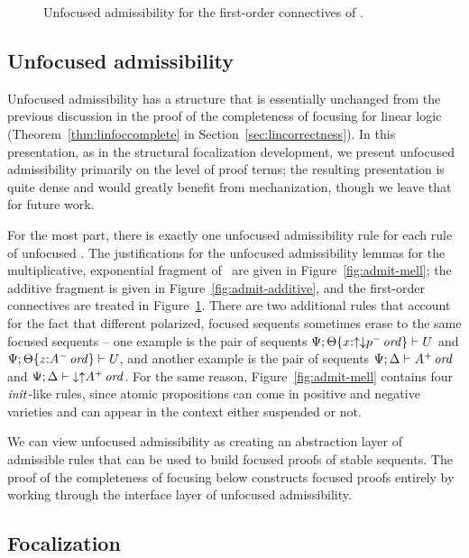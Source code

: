 \begin{figure}[tp]
\caption{Unfocused admissibility for the first-order connectives of \ollll.}
\label{fig:admit-fo}
\end{figure}

\subsection{Unfocused admissibility}
\label{sec:ord-unfocused-admissibility}

Unfocused admissibility has a structure that is essentially unchanged
from the previous discussion in the proof of the completeness of
focusing for linear logic (Theorem~\ref{thm:linfoccomplete} in
Section~\ref{sec:lincorrectness}). In this presentation, as in the
structural focalization development, we present unfocused
admissibility primarily on the level of proof terms; the resulting
presentation is quite dense and would greatly benefit from 
mechanization, though we leave that for future work. 

For the most part, there is exactly one unfocused admissibility rule
for each rule of unfocused \ollll. 
The justifications for the 
unfocused admissibility lemmas for the multiplicative, exponential
fragment of \ollll~are given in Figure~\ref{fig:admit-mell}; the
additive fragment is given in Figure~\ref{fig:admit-additive}, and
the first-order connectives are treated in Figure~\ref{fig:admit-fo}.
There are two additional
rules that account for the fact that different polarized, focused sequents
sometimes erase to the same focused sequents -- 
one example is the pair
of sequents 
${\Psi};{{\Theta}\{{x{:}{{\uparrow}{\downarrow}p^-}\,{{\it ord}}}\}} \vdash {U}$ 
and ${\Psi};{{\Theta}\{{z{:}{{A^-}}\,{{\it ord}}}\}} \vdash {U}$, and
another example is the pair of sequents
${\Psi};{\Delta} \vdash {{A^+}\,{{\it ord}}}$ and 
${\Psi};{\Delta} \vdash {{{\downarrow}{\uparrow}A^+}\,{{\it ord}}}$.
For the same reason, Figure~\ref{fig:admit-mell} contains four
${\it init}$-like rules, since atomic propositions can come in positive
and negative varieties and can appear in the context either suspended or not.

We can view unfocused admissibility as creating an abstraction layer
of admissible rules that can be used to build focused proofs of stable
sequents.  The proof of the completeness of focusing below constructs
focused proofs entirely by working through the interface layer of
unfocused admissibility.


\subsection{Focalization}

